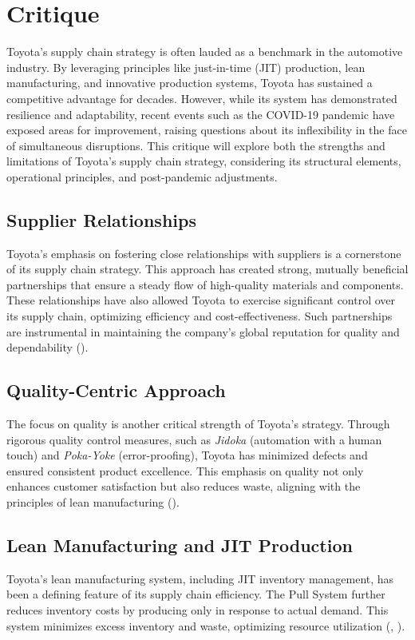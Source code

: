 \section{Critique}

Toyota's supply chain strategy is often lauded as a benchmark in the automotive industry. By leveraging principles like just-in-time (JIT) production, lean manufacturing, and innovative production systems, Toyota has sustained a competitive advantage for decades. However, while its system has demonstrated resilience and adaptability, recent events such as the COVID-19 pandemic have exposed areas for improvement, raising questions about its inflexibility in the face of simultaneous disruptions. This critique will explore both the strengths and limitations of Toyota’s supply chain strategy, considering its structural elements, operational principles, and post-pandemic adjustments.

\subsection{Supplier Relationships}
Toyota’s emphasis on fostering close relationships with suppliers is a cornerstone of its supply chain strategy. This approach has created strong, mutually beneficial partnerships that ensure a steady flow of high-quality materials and components. These relationships have also allowed Toyota to exercise significant control over its supply chain, optimizing efficiency and cost-effectiveness. Such partnerships are instrumental in maintaining the company’s global reputation for quality and dependability (\cite{dfreight}).

\subsection{Quality-Centric Approach}
The focus on quality is another critical strength of Toyota’s strategy. Through rigorous quality control measures, such as \textit{Jidoka} (automation with a human touch) and \textit{Poka-Yoke} (error-proofing), Toyota has minimized defects and ensured consistent product excellence. This emphasis on quality not only enhances customer satisfaction but also reduces waste, aligning with the principles of lean manufacturing (\cite{dfreight}).

\subsection{Lean Manufacturing and JIT Production}
Toyota’s lean manufacturing system, including JIT inventory management, has been a defining feature of its supply chain efficiency. The Pull System further reduces inventory costs by producing only in response to actual demand. This system minimizes excess inventory and waste, optimizing resource utilization (\cite{dfreight}, \cite{everythingsupplychain}).

